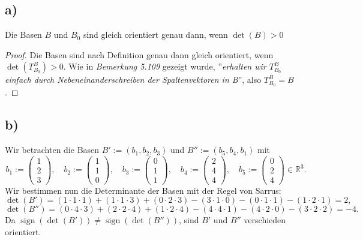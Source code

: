 \documentclass{article}
\DeclareMathOperator{\sign}{sign}
\begin{document}
\subsection*{a)}

Die Basen $B$ und $B_0$ sind gleich orientiert genau
dann, wenn $\det(B) > 0$

\begin{proof}
  Die Basen sind nach Definition genau dann gleich orientiert,
  wenn $\det(T^B_{B_0}) > 0$. Wie in \textit{Bemerkung 5.109}
  gezeigt wurde, ''\textit{erhalten wir $T^B_{B_0}$
  einfach durch Nebeneinanderschreiben der Spaltenvektoren in B}'',
  also $T^B_{B_0} = B$.
\end{proof}

\subsection*{b)}
Wir betrachten die Basen
$B' := (b_1 , b_2 , b_3)$
und
$B'' := (b_5 , b_4 , b_1)$
mit
\[
  b_1 := \begin{pmatrix} 1 \\ 2 \\ 3 \end{pmatrix}, \quad
  b_2 := \begin{pmatrix} 1 \\ 1 \\ 0 \end{pmatrix}, \quad
  b_3 := \begin{pmatrix} 0 \\ 1 \\ 1 \end{pmatrix}, \quad
  b_4 := \begin{pmatrix} 2 \\ 4 \\ 4 \end{pmatrix}, \quad
  b_5 := \begin{pmatrix} 0 \\ 2 \\ 4 \end{pmatrix} \in \mathbb{R}^3.
\]
Wir bestimmen nun die Determinante der Basen
mit der Regel von Sarrus:
\[
  \det(B')
  =
  (1 \cdot 1 \cdot 1) + (1 \cdot 1 \cdot 3)
  + (0 \cdot 2 \cdot 3) - (3 \cdot 1 \cdot 0) - (0 \cdot 1
  \cdot 1) - (1 \cdot 2 \cdot 1)
  = 2,
\]
\[
  \det(B'')
  =
  (0 \cdot 4 \cdot 3) + (2 \cdot 2 \cdot 4)
  + (1 \cdot 2 \cdot 4) - (4 \cdot 4 \cdot 1) - (4 \cdot 2
  \cdot 0) - (3 \cdot 2 \cdot 2)
  = -4.
\]
Da $\sign(\det(B')) \neq \sign(\det(B''))$,
sind $B'$ und $B''$ verschieden orientiert.
\end{document}
